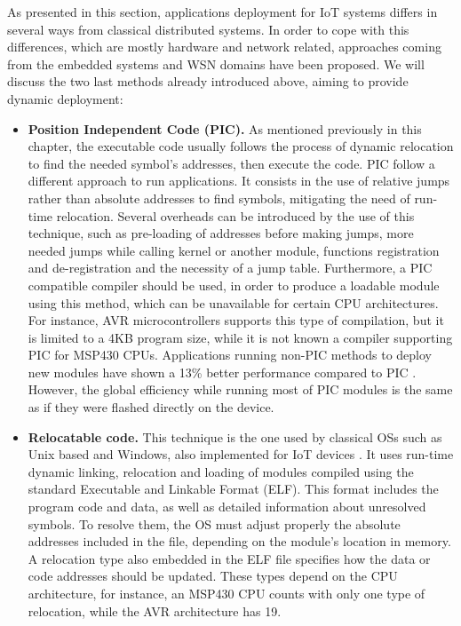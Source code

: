As presented in this section, applications deployment for IoT systems differs in several ways from classical distributed systems.
In order to cope with this differences, which are mostly hardware and network related, approaches coming from the embedded systems and WSN domains have been proposed.
We will discuss the two last methods already introduced above, aiming to provide dynamic deployment: 
\begin{itemize}
	\item \textbf{Position Independent Code (PIC).} As mentioned previously in this chapter, the executable code usually follows the process of dynamic relocation to find the needed symbol's addresses, then execute the code. 
	PIC follow a different approach to run applications. 
	It consists in the use of relative jumps rather than absolute addresses to find symbols, mitigating the need of run-time relocation.
	Several overheads can be introduced by the use of this technique, such as pre-loading of addresses before making jumps, more needed jumps while calling kernel or another module, functions registration and de-registration and the necessity of a jump table.
	Furthermore, a PIC compatible compiler should be used, in order to produce a loadable module using this method, which can be unavailable for certain CPU architectures.
	For instance, AVR microcontrollers supports this type of compilation, but it is limited to a 4KB program size, while it is not known a compiler supporting PIC for MSP430 CPUs.
	Applications running non-PIC methods to deploy new modules have shown a 13\% better performance compared to PIC \cite{dong2009dynamic}.
	However, the global efficiency while running most of PIC modules is the same as if they were flashed directly on the device.
	\item \textbf{Relocatable code.} This technique is the one used by classical OSs such as Unix based and Windows, also implemented for IoT devices \cite{dunkels06runtime}. 
	It uses run-time dynamic linking, relocation and loading of modules compiled using the standard Executable and Linkable Format (ELF).
	This format includes the program code and data, as well as detailed information about unresolved symbols.
	To resolve them, the OS must adjust properly the absolute addresses included in the file, depending on the module's location in memory.
	A relocation type also embedded in the ELF file specifies how the data or code addresses should be updated.
	These types depend on the CPU architecture, for instance, an MSP430 CPU counts with only one type of relocation, while the AVR architecture has 19.

\end{itemize}
